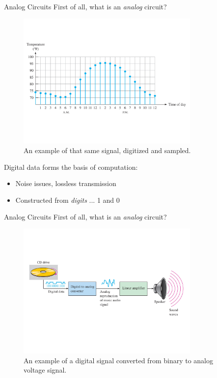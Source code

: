 \documentclass{beamer}
\begin{document}
\begin{frame}{Analog Circuits}
\small
First of all, what is an \textit{analog} circuit?
\begin{figure}
\includegraphics[width=0.8\textwidth,trim=0cm 4cm 0cm 4cm,clip=true]{analog2.pdf}
\caption{\label{fig:analog2} An example of that same signal, digitized and sampled.}
\end{figure}
Digital data forms the basis of computation:
\begin{itemize}
\item Noise issues, lossless transmission
\item Constructed from \textit{digits} ... 1 and 0
\end{itemize}
\end{frame}

\begin{frame}{Analog Circuits}
\small
First of all, what is an \textit{analog} circuit?
\begin{figure}
\includegraphics[width=0.8\textwidth,trim=0cm 4cm 0cm 4cm,clip=true]{analog3.pdf}
\caption{\label{fig:analog3} An example of a digital signal converted from binary to analog voltage signal.}
\end{figure}
\end{frame}
\end{document}
